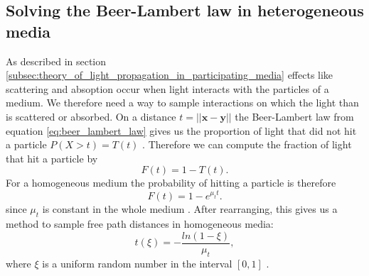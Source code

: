 \subsection{Solving the Beer-Lambert law in heterogeneous media}
As described in section \ref{subsec:theory_of_light_propagation_in_participating_media} effects like scattering and absoption occur when light interacts with the particles of a medium.
We therefore need a way to sample interactions on which the light than is scattered or absorbed.
On a distance $t=||\boldsymbol{x} - \boldsymbol{y}||$ the Beer-Lambert law from equation \ref{eq:beer_lambert_law} gives us the proportion of light that did not hit a particle $P(X > t) = T(t)$ \cite[p. 5]{novak_overview}.
Therefore we can compute the fraction of light that hit a particle by \cite[p. 5]{novak_overview}
\begin{equation}
    F(t) = 1 - T(t).
\end{equation}
For a homogeneous medium the probability of hitting a particle is therefore
\begin{equation}
    F(t) = 1 - e^{\mu_t t}.
\end{equation}
since $\mu_t$ is constant in the whole medium \cite[p. 5]{novak_overview}.
After rearranging, this gives us a method to sample free path distances in homogeneous media:
\begin{equation}
    \label{eq:distance_sampling}
    t(\xi) = -\frac{ln(1-\xi)}{\mu_t},
\end{equation}
where $\xi$ is a uniform random number in the interval $[0, 1]$ \cite[p. 5]{novak_overview}.

